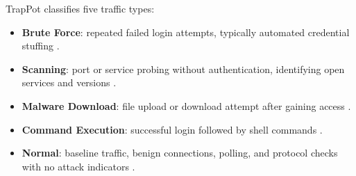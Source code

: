 TrapPot classifies five traffic types:

\begin{itemize}
\item \textbf{Brute Force}: repeated failed login attempts, typically automated credential stuffing \cite{203628,famera2025mirai}.
\item \textbf{Scanning}: port or service probing without authentication, identifying open services and versions \cite{zhang2023identification,suareztangil2023stories}.
\item \textbf{Malware Download}: file upload or download attempt after gaining access \cite{9071014,9558948}.
\item \textbf{Command Execution}: successful login followed by shell commands \cite{9071014,lee2021classification}.
\item \textbf{Normal}: baseline traffic, benign connections, polling, and protocol checks with no attack indicators \cite{lee2021classification}.
\end{itemize}
